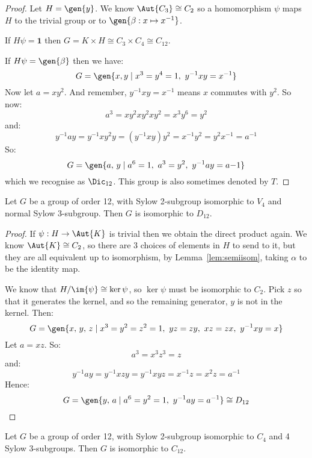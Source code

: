\begin{proof}
    Let \(H = \gen{y}\).
    We know \(\Aut{C_3} \cong C_2\) so a homomorphism \(\psi\) maps \(H\) to the trivial group or to \(\gen{\beta:x
    \mapsto x^{-1}}\).

    If \(H\psi = \bm{1}\) then \(G = K \times H \cong C_3 \times C_4 \cong C_{12}\).

    If \(H\psi = \gen{\beta}\) then we have:
    \[G = \gen{x, y \mid x^3 = y^4 = 1,\ y^{-1}xy = x^{-1}}\]
    Now let \(a = xy^2\).
    And remember, \(y^{-1}xy = x^{-1}\) means \(x\) commutes with \(y^2\).
    So now:
    \[a^3 = xy^2xy^2xy^2 = x^3y^6 = y^2\]
    and:
    \[y^{-1}ay = y^{-1}xy^2y = (y^{-1}xy)y^2 = x^{-1}y^2 = y^2x^{-1} = a^{-1}\]
    So:
    \[G = \gen{a,\,y \mid a^6 = 1,\ a^3 = y^2,\ y^{-1}ay = a{-1}}\]
    which we recognise as \(\Dic_{12}\).
    This group is also sometimes denoted by \(T\).
\end{proof}

\begin{lemma}
    Let \(G\) be a group of order 12, with Sylow 2-subgroup isomorphic to \(V_4\) and normal Sylow 3-subgroup.
    Then \(G\) is isomorphic to \(D_{12}\).
\end{lemma}

\begin{proof}
    If \(\psi:H \to \Aut{K}\) is trivial then we obtain the direct product again.
    We know \(\Aut{K} \cong C_2\), so there are 3 choices of elements in \(H\) to send to it, but they are all
    equivalent up to isomorphism, by Lemma~\ref{lem:semiisom}, taking \(\alpha\) to be the identity map.

    We know that \(H / \im{\psi} \cong \ker{\psi}\), so \(\ker{\psi}\) must be isomorphic to \(C_2\).
    Pick \(z\) so that it generates the kernel, and so the remaining generator, \(y\) is not in the kernel.
    Then:
    \[G = \gen{x,\,y,\,z \mid x^3 = y^2 = z^2 = 1,\ yz = zy,\ xz = zx,\ y^{-1}xy = x}\]
    Let \(a = xz\).
    So:
    \[a^3 = x^3z^3 = z\]
    and:
    \[ y^{-1}ay = y^{-1}xzy = y^{-1}xyz = x^{-1}z = x^2z = a^{-1}\]
    Hence:
    \[G = \gen{y,\,a \mid a^6 = y^2 = 1,\ y^{-1}ay = a^{-1}} \cong D_{12}\]
\end{proof}

\begin{lemma}
    Let \(G\) be a group of order 12, with Sylow 2-subgroup isomorphic to \(C_4\) and 4 Sylow 3-subgroups.
    Then \(G\) is isomorphic to \(C_{12}\).
\end{lemma}

